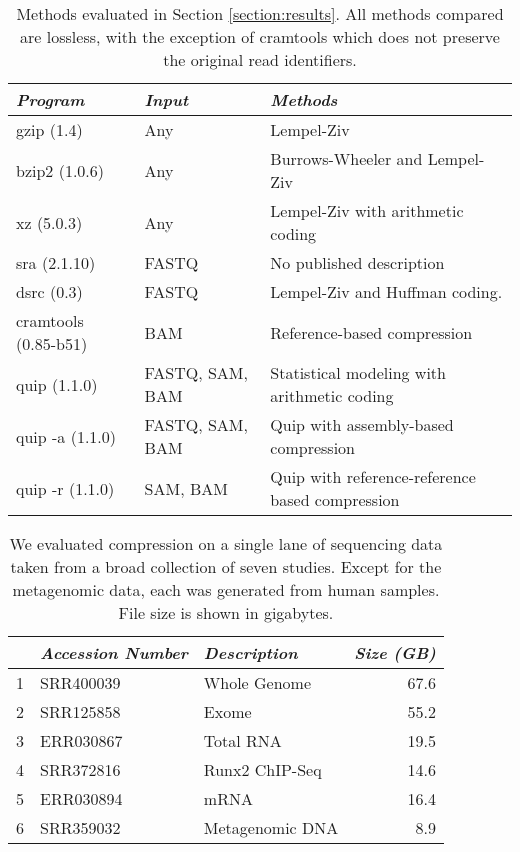 \documentclass[twocolumn]{article}
\begin{document}
\begin{table*}
\begin{center}
\begin{tabular}{lll}
\textit{Program}     & \textit{Input} & \textit{Methods} \\ \hline
gzip (1.4)           & Any &
Lempel-Ziv \\

bzip2 (1.0.6)        & Any &
Burrows-Wheeler and Lempel-Ziv \\

xz  (5.0.3)          & Any & 
Lempel-Ziv with arithmetic coding \\

sra (2.1.10)         & FASTQ &
No published description \\

dsrc (0.3)           & FASTQ &
Lempel-Ziv and Huffman coding. \\

cramtools (0.85-b51) & BAM &
Reference-based compression \\

quip (1.1.0)         & FASTQ, SAM, BAM &
Statistical modeling with arithmetic coding \\

quip -a (1.1.0)      & FASTQ, SAM, BAM &
Quip with assembly-based compression \\

quip -r (1.1.0) & SAM, BAM &
Quip with reference-reference based compression \\
\end{tabular}
\caption{Methods evaluated in Section \ref{section:results}.
All methods compared are lossless, with the exception of cramtools which
does not preserve the original read identifiers.}
\end{center}
\label{tab:methods}
\end{table*}


\begin{table}
\begin{tabular}{rllr}
  & \textit{Accession Number} & \textit{Description} & \textit{Size (GB)} \\ \hline
1 & SRR400039                 & Whole Genome         & 67.6 \\
2 & SRR125858                 & Exome                & 55.2 \\
3 & ERR030867                 & Total RNA            & 19.5 \\
4 & SRR372816                 & Runx2 ChIP-Seq       & 14.6 \\
5 & ERR030894                 & mRNA                 & 16.4 \\
6 & SRR359032                 & Metagenomic DNA      &  8.9 \\
\end{tabular}
\caption{
We evaluated compression on a single lane of sequencing data taken from a
broad collection of seven studies. Except for the metagenomic data, each was
generated from human samples. File size is shown in gigabytes.
}
\label{tab:datasets}
\end{table}
\end{document}
